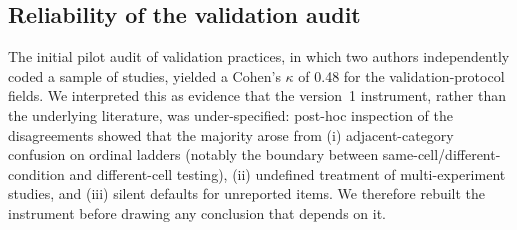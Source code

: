 %
%

\subsection{Reliability of the validation audit}

The initial pilot audit of validation practices, in which two authors
independently coded a sample of studies, yielded a Cohen's
$\kappa$ of 0.48 for the validation-protocol fields. We interpreted this
as evidence that the version~1 instrument, rather than the underlying
literature, was under-specified: post-hoc inspection of the
disagreements showed that the majority arose from (i) adjacent-category
confusion on ordinal ladders (notably the boundary between
same-cell/different-condition and different-cell testing), (ii)
undefined treatment of multi-experiment studies, and (iii) silent
defaults for unreported items. We therefore rebuilt the instrument
before drawing any conclusion that depends on it.

